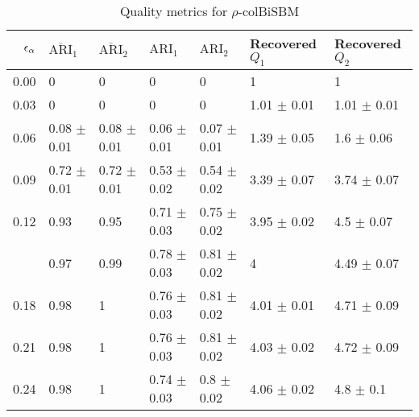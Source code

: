 \begin{table}[!h]

\caption{\label{tab:per_model_table}\label{tab:per_model_rho}Quality metrics for $\rho$-colBiSBM}
\centering
\begin{tabular}[t]{rllllll}
\toprule
$\eps[\alpha]$ & $\overline{\text{ARI}}_{1}$ & $\overline{\text{ARI}}_{2}$ & $\text{ARI}_{1}$ & $\text{ARI}_{2}$ & Recovered $Q_1$ & Recovered $Q_2$\\
\midrule
0.00 & 0 & 0 & 0 & 0 & 1 & 1\\
0.03 & 0 & 0 & 0 & 0 & 1.01 $\pm$ 0.01 & 1.01 $\pm$ 0.01\\
0.06 & 0.08 $\pm$ 0.01 & 0.08 $\pm$ 0.01 & 0.06 $\pm$ 0.01 & 0.07 $\pm$ 0.01 & 1.39 $\pm$ 0.05 & 1.6 $\pm$ 0.06\\
0.09 & 0.72 $\pm$ 0.01 & 0.72 $\pm$ 0.01 & 0.53 $\pm$ 0.02 & 0.54 $\pm$ 0.02 & 3.39 $\pm$ 0.07 & 3.74 $\pm$ 0.07\\
0.12 & 0.93 & 0.95 & 0.71 $\pm$ 0.03 & 0.75 $\pm$ 0.02 & 3.95 $\pm$ 0.02 & 4.5 $\pm$ 0.07\\
\addlinespace
0.15 & 0.97 & 0.99 & 0.78 $\pm$ 0.03 & 0.81 $\pm$ 0.02 & 4 & 4.49 $\pm$ 0.07\\
0.18 & 0.98 & 1 & 0.76 $\pm$ 0.03 & 0.81 $\pm$ 0.02 & 4.01 $\pm$ 0.01 & 4.71 $\pm$ 0.09\\
0.21 & 0.98 & 1 & 0.76 $\pm$ 0.03 & 0.81 $\pm$ 0.02 & 4.03 $\pm$ 0.02 & 4.72 $\pm$ 0.09\\
0.24 & 0.98 & 1 & 0.74 $\pm$ 0.03 & 0.8 $\pm$ 0.02 & 4.06 $\pm$ 0.02 & 4.8 $\pm$ 0.1\\
\bottomrule
\end{tabular}
\end{table}
